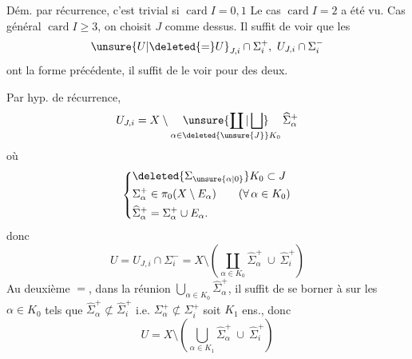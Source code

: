 Dém. par récurrence, c'est trivial si $\operatorname{card} I=0,1$ Le cas $\operatorname{card} I=2$ a été vu. Cas général  $\operatorname{card} I\geq 3$, on choisit $J$ comme dessus. Il suffit de voir que les 
\[
\unsure{U|\deleted{=}U}_{J,i}\cap\Sigma_i^+,\ U_{J,i}\cap\Sigma_i^-
\]
ont la forme précédente, il suffit de le voir pour  des deux.

Par hyp. de récurrence, 
\[
U_{J,i}=X\setminus\mathop{\unsure{\coprod|\bigsqcup}}\limits_{\alpha\in \deleted{\unsure{J}}K_0}\widehat{\Sigma}_\alpha^+
\]
où
\[
\left\{\begin{aligned}
&\deleted{\Sigma_{\unsure{\alpha|0}}}K_0\subset J\\
&\Sigma_\alpha^+\in\pi_0(X\setminus E_\alpha)\qquad (\forall\,\alpha\in K_0)\\
&\widehat{\Sigma}_\alpha^+=\Sigma_\alpha^+\cup E_\alpha.
\end{aligned}\right.
\]
 donc
\[
U=U_{J,i}\cap\Sigma_i^-=X\setminus\left(\coprod_{\alpha\in K_0}\widehat{\Sigma}_\alpha^+\ \cup\ \widehat{\Sigma}_i^+\right)
\]
 Au deuxième $=$, dans la  réunion $\bigcup_{\alpha\in K_0}\widehat{\Sigma}_\alpha^+$, il suffit de se borner à  sur les \deleted{$\Sigma$} $\alpha\in K_0$ tels que $\widehat{\Sigma}_\alpha^+\not\subset\widehat{\Sigma}_i^+$ i.e. $\Sigma_\alpha^+\not\subset\Sigma_i^+$ soit $K_1$  ens., donc
\[
U=X\setminus\left(\bigcup_{\alpha\in K_1}\widehat{\Sigma}_\alpha^+\ \cup\ \widehat{\Sigma}_i^+\right)
\]
